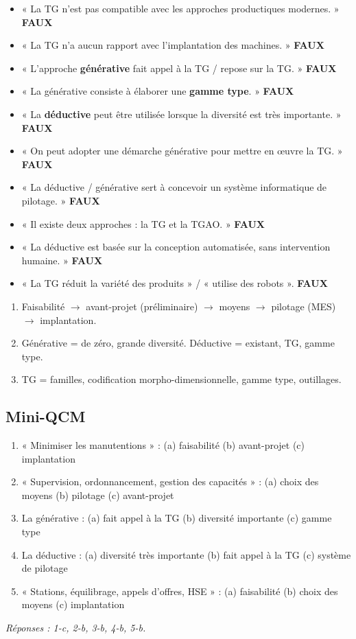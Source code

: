 \documentclass[11pt,a4paper]{article}
\newcommand{\faux}{\textcolor{rouge}{\textbf{FAUX}}}
\begin{document}
\begin{piege}
\begin{itemize}
\item « La TG n'est pas compatible avec les approches productiques modernes. » \faux
\item « La TG n'a aucun rapport avec l'implantation des machines. » \faux
\item « L'approche \textbf{générative} fait appel à la TG / repose sur la TG. » \faux
\item « La générative consiste à élaborer une \textbf{gamme type}. » \faux
\item « La \textbf{déductive} peut être utilisée lorsque la diversité est très importante. » \faux
\item « On peut adopter une démarche générative pour mettre en œuvre la TG. » \faux
\item « La déductive / générative sert à concevoir un système informatique de pilotage. » \faux
\item « Il existe deux approches : la TG et la TGAO. » \faux
\item « La déductive est basée sur la conception automatisée, sans intervention humaine. » \faux
\item « La TG réduit la variété des produits » / « utilise des robots ». \faux
\end{itemize}
\end{piege}

\begin{resume}
\begin{enumerate}
\item Faisabilité $\rightarrow$ avant-projet (préliminaire) $\rightarrow$ moyens $\rightarrow$ pilotage (MES) $\rightarrow$ implantation.
\item Générative = de zéro, grande diversité. Déductive = existant, TG, gamme type.
\item TG = familles, codification morpho-dimensionnelle, gamme type, outillages.
\end{enumerate}
\end{resume}

\subsection*{Mini-QCM}
\begin{enumerate}
\item « Minimiser les manutentions » : (a) faisabilité (b) avant-projet (c) implantation
\item « Supervision, ordonnancement, gestion des capacités » : (a) choix des moyens (b) pilotage (c) avant-projet
\item La générative : (a) fait appel à la TG (b) diversité importante (c) gamme type
\item La déductive : (a) diversité très importante (b) fait appel à la TG (c) système de pilotage
\item « Stations, équilibrage, appels d'offres, HSE » : (a) faisabilité (b) choix des moyens (c) implantation
\end{enumerate}
{\small\textit{Réponses : 1-c, 2-b, 3-b, 4-b, 5-b.}}
\end{document}
